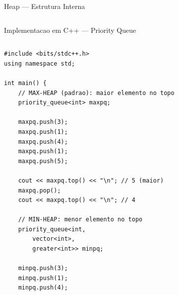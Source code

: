 \documentclass[aspectratio=169,11pt]{beamer}
\begin{document}
\begin{frame}{Heap --- Estrutura Interna}
\begin{columns}[c]
  \end{columns}
\end{frame}

\begin{frame}[fragile,shrink=6]{Implementacao em C++ --- Priority Queue}
  \begin{columns}[t]
      \begin{tcolorbox}[caixaCodigo]
        \begin{lstlisting}[style=cppstyle]
#include <bits/stdc++.h>
using namespace std;

int main() {
    // MAX-HEAP (padrao): maior elemento no topo
    priority_queue<int> maxpq;

    maxpq.push(3);
    maxpq.push(1);
    maxpq.push(4);
    maxpq.push(1);
    maxpq.push(5);

    cout << maxpq.top() << "\n"; // 5 (maior)
    maxpq.pop();
    cout << maxpq.top() << "\n"; // 4

    // MIN-HEAP: menor elemento no topo
    priority_queue<int,
        vector<int>,
        greater<int>> minpq;

    minpq.push(3);
    minpq.push(1);
    minpq.push(4);


\end{lstlisting}
\end{tcolorbox}
\end{columns}
\end{frame}
\end{document}
